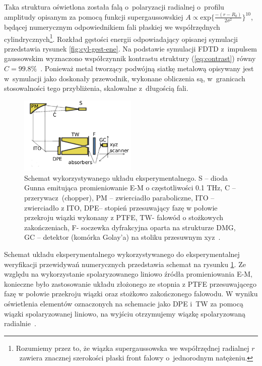 Taka struktura oświetlona została falą o~polaryzacji radialnej o~profilu amplitudy opisanym za pomocą funkcji supergaussowskiej $A \propto \textrm{exp}\{\frac{-(r-R_0)}{2\sigma^2}\}^{10}$, będącej numerycznym odpowiednikiem fali płaskiej we współrzędnych cylindrycznych\footnote{Rozumiemy przez to, że wiązka supergaussowska we współrzędnej radialnej $r$~zawiera znacznej szerokości płaski front falowy o~jednorodnym natężeniu.}. Rozkład gęstości energii odpowiadający opisanej symulacji przedstawia rysunek \ref{fig:cyl-gest-ene}. Na podstawie symulacji FDTD z~impulsem gaussowskim wyznaczono współczynnik kontrastu struktury (\ref{eq:contrast}) równy $C=99.8\%$~\cite{Yavorskiy:14}. Ponieważ metal tworzący podwójną siatkę metalową opisywany jest w~symulacji jako doskonały przewodnik, wykonane obliczenia są, w~granicach stosowalności tego przybliżenia, skalowalne z~długością fali.

\begin{figure}[htb]
	\centering
	\includegraphics[width=0.5\textwidth]{images/thz/exp-express-schem.png}
	\caption{Schemat wykorzystywanego układu eksperymentalnego. S – dioda Gunna emitująca promieniowanie E-M o częstotliwości 0.1 THz, C – przerywacz~(chopper), PM – zwierciadło paraboliczne, ITO – zwierciadło z ITO, DPE– stopień przesuwający fazę w połowie przekroju wiązki wykonany z PTFE, TW- falowód o stożkowych zakończeniach, F- soczewka dyfrakcyjna oparta na strukturze DMG, GC – detektor (komórka Golay'a) na stoliku przesuwnym xyz~\cite{Yavorskiy:14}.}
	\label{fig:opt-exp-schem}
\end{figure}

Schemat układu eksperymentalnego wykorzystywanego do eksperymentalnej weryfikacji przewidywań numerycznych przedstawia schemat na rysunku \ref{fig:opt-exp-schem}. Ze względu na wykorzystanie spolaryzowanego liniowo źródła promieniowania E-M, konieczne było zastosowanie układu złożonego ze stopnia z PTFE przesuwającego fazę w połowie przekroju wiązki oraz stożkowo zakończonego falowodu. W wyniku oświetlenia elementów oznaczonych na schemacie jako DPE i~TW za pomocą wiązki spolaryzowanej liniowo, na wyjściu otrzymujemy wiązkę spolaryzowaną radialnie~\cite{grosjean2008linear}.

